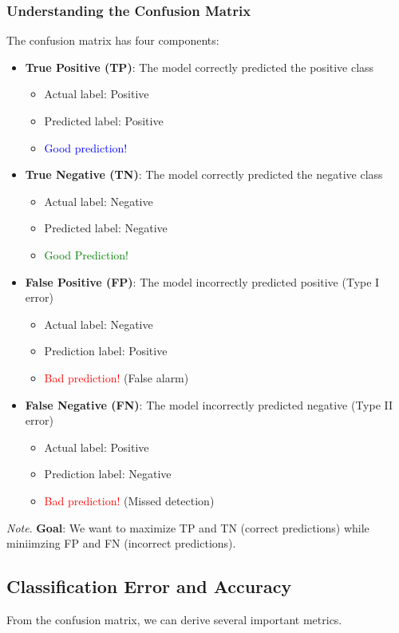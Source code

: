 \documentclass[a4paper]{article}
\theoremstyle{definition}
\begin{document}
\subsubsection{Understanding the Confusion Matrix}
The confusion matrix has four components:
\begin{itemize}
    \item \textbf{True Positive (TP)}: The model correctly predicted the positive class
    \begin{itemize}
        \item Actual label: Positive
        \item Predicted label: Positive 
        \item \textcolor{blue}{Good prediction!}
    \end{itemize}
    \item \textbf{True Negative (TN)}: The model correctly predicted the negative class 
    \begin{itemize}
        \item Actual label: Negative
        \item Predicted label: Negative
        \item \textcolor{green}{Good Prediction!}
    \end{itemize}
    \item \textbf{False Positive (FP)}: The model incorrectly predicted positive (Type I error)
    \begin{itemize}
        \item Actual label: Negative 
        \item Prediction label: Positive 
        \item \textcolor{red}{Bad prediction!} (False alarm)
    \end{itemize}
    \item \textbf{False Negative (FN)}: The model incorrectly predicted negative (Type II error)
    \begin{itemize}
        \item Actual label: Positive 
        \item Prediction label: Negative 
        \item \textcolor{red}{Bad prediction!} (Missed detection)
    \end{itemize}
\end{itemize}
\textit{Note}. \textbf{Goal}: We want to maximize TP and TN (correct predictions) while miniimzing FP and FN (incorrect predictions).
\subsection{Classification Error and Accuracy}
From the confusion matrix, we can derive several important metrics.
\end{document}
